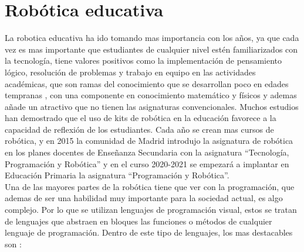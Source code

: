\section{Robótica educativa}
\label{sec:educativa}
La robotica educativa ha ido tomando mas importancia con los años, ya que cada vez es mas importante que estudiantes de cualquier nivel estén familiarizados con la tecnología, tiene valores positivos como la implementación de pensamiento lógico, resolución de problemas y trabajo en equipo en las actividades académicas, que son ramas del conocimiento que se desarrollan poco en edades tempranas , con una componente en conocimiento matemático y físicos y ademas añade un atractivo que no tienen las asignaturas convencionales.
Muchos estudios han demostrado que el uso de kits de robótica en la educación favorece a la capacidad de reflexión de los estudiantes.
Cada año se crean mas cursos de robótica, y en 2015 la comunidad de Madrid introdujo la asignatura de robótica en los planes docentes de Enseñanza Secundaria con la asignatura ``Tecnología, Programación y Robótica''\cite{bib:secundaria} y en el curso 2020-2021 se empezará a implantar en Educación Primaria la asignatura ``Programación y Robótica''\cite{bib:primaria}.\\
Una de las mayores partes de la robótica tiene que ver con la programación, que ademas de ser una habilidad muy importante para la sociedad actual, es algo complejo. Por lo que se utilizan lenguajes de programación visual, estos se tratan de lenguajes que abstraen en bloques las funciones o métodos de cualquier lenguaje de programación. Dentro de este tipo de lenguajes, los mas destacables son :

